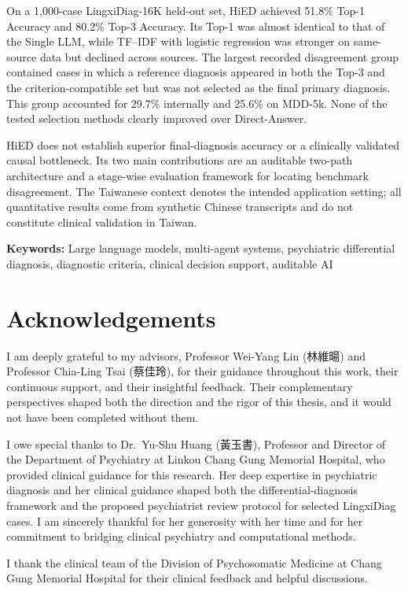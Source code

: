 \documentclass[12pt,a4paper,oneside]{report}
\begin{document}
On a 1,000-case LingxiDiag-16K held-out set, HiED achieved 51.8\% Top-1 Accuracy and 80.2\% Top-3 Accuracy. Its Top-1 was almost identical to that of the Single LLM, while TF--IDF with logistic regression was stronger on same-source data but declined across sources. The largest recorded disagreement group contained cases in which a reference diagnosis appeared in both the Top-3 and the criterion-compatible set but was not selected as the final primary diagnosis. This group accounted for 29.7\% internally and 25.6\% on MDD-5k. None of the tested selection methods clearly improved over Direct-Answer.

HiED does not establish superior final-diagnosis accuracy or a clinically validated causal bottleneck. Its two main contributions are an auditable two-path architecture and a stage-wise evaluation framework for locating benchmark disagreement. The Taiwanese context denotes the intended application setting; all quantitative results come from synthetic Chinese transcripts and do not constitute clinical validation in Taiwan.

\noindent\textbf{Keywords:} Large language models, multi-agent systems, psychiatric differential diagnosis, diagnostic criteria, clinical decision support, auditable AI
\chapter*{Acknowledgements}

I am deeply grateful to my advisors, Professor Wei-Yang Lin (林維暘)
and Professor Chia-Ling Tsai (蔡佳玲), for their guidance throughout
this work, their continuous support, and their insightful feedback.
Their complementary perspectives shaped both the direction and the
rigor of this thesis, and it would not have been completed without
them.

I owe special thanks to Dr.\ Yu-Shu Huang (黃玉書), Professor and
Director of the Department of Psychiatry at Linkou Chang Gung Memorial
Hospital, who provided clinical guidance for this
research. Her deep expertise in psychiatric diagnosis and her clinical
guidance shaped both the differential-diagnosis framework and the
proposed psychiatrist review protocol for selected LingxiDiag cases. I am
sincerely thankful for her generosity with her time and for her
commitment to bridging clinical psychiatry and computational methods.

I thank the clinical team of the Division of Psychosomatic Medicine at
Chang Gung Memorial Hospital for their clinical feedback and helpful
discussions.
\end{document}
